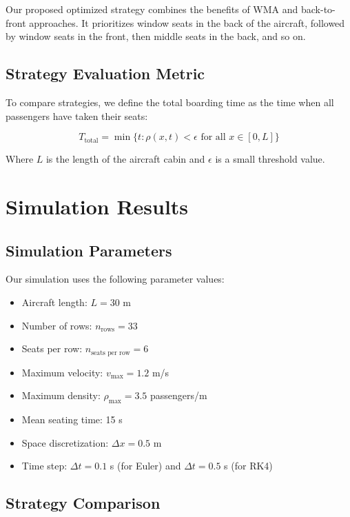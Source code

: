 \documentclass[a4paper,12pt]{article}
\begin{document}
Our proposed optimized strategy combines the benefits of WMA and back-to-front approaches. It prioritizes window seats in the back of the aircraft, followed by window seats in the front, then middle seats in the back, and so on.

\subsection{Strategy Evaluation Metric}

To compare strategies, we define the total boarding time as the time when all passengers have taken their seats:

\begin{equation}
T_{\text{total}} = \min\{t : \rho(x,t) < \epsilon \text{ for all } x \in [0, L]\}
\end{equation}

Where $L$ is the length of the aircraft cabin and $\epsilon$ is a small threshold value.

\section{Simulation Results}

\subsection{Simulation Parameters}

Our simulation uses the following parameter values:
\begin{itemize}
    \item Aircraft length: $L = 30$ m
    \item Number of rows: $n_{\text{rows}} = 33$
    \item Seats per row: $n_{\text{seats per row}} = 6$
    \item Maximum velocity: $v_{\text{max}} = 1.2$ m/s
    \item Maximum density: $\rho_{\text{max}} = 3.5$ passengers/m
    \item Mean seating time: 15 s
    \item Space discretization: $\Delta x = 0.5$ m
    \item Time step: $\Delta t = 0.1$ s (for Euler) and $\Delta t = 0.5$ s (for RK4)
\end{itemize}

\subsection{Strategy Comparison}
\end{document}

